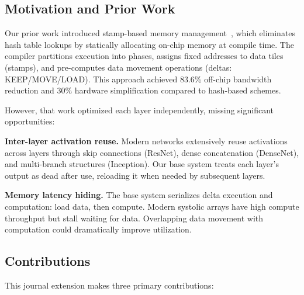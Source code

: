 \documentclass[journal]{IEEEtran}
\begin{document}
\subsection{Motivation and Prior Work}

Our prior work introduced stamp-based memory management~\cite{stampconf2026}, which eliminates hash table lookups by statically allocating on-chip memory at compile time. The compiler partitions execution into phases, assigns fixed addresses to data tiles (stamps), and pre-computes data movement operations (deltas: KEEP/MOVE/LOAD). This approach achieved 83.6\% off-chip bandwidth reduction and 30\% hardware simplification compared to hash-based schemes.

However, that work optimized each layer independently, missing significant opportunities:

\textbf{Inter-layer activation reuse.} Modern networks extensively reuse activations across layers through skip connections (ResNet), dense concatenation (DenseNet), and multi-branch structures (Inception). Our base system treats each layer's output as dead after use, reloading it when needed by subsequent layers.

\textbf{Memory latency hiding.} The base system serializes delta execution and computation: load data, then compute. Modern systolic arrays have high compute throughput but stall waiting for data. Overlapping data movement with computation could dramatically improve utilization.

\subsection{Contributions}

This journal extension makes three primary contributions:
\end{document}
